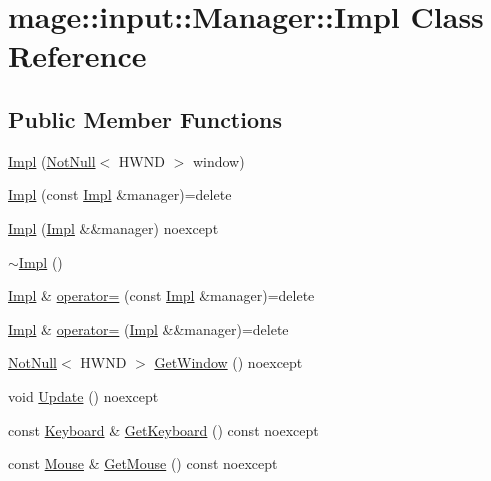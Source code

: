 \hypertarget{classmage_1_1input_1_1_manager_1_1_impl}{}\section{mage\+:\+:input\+:\+:Manager\+:\+:Impl Class Reference}
\label{classmage_1_1input_1_1_manager_1_1_impl}
\subsection*{Public Member Functions}
\begin{DoxyCompactItemize}
\item 
\mbox{\hyperlink{classmage_1_1input_1_1_manager_1_1_impl_ac0bc834732b5870792d1b6557e9bbaf7}{Impl}} (\mbox{\hyperlink{namespacemage_a8769f9d670d6b585ea306cb1062af94b}{Not\+Null}}$<$ H\+W\+ND $>$ window)
\item 
\mbox{\hyperlink{classmage_1_1input_1_1_manager_1_1_impl_a9c1f7ee1af99eb2811820d622850dc06}{Impl}} (const \mbox{\hyperlink{classmage_1_1input_1_1_manager_1_1_impl}{Impl}} \&manager)=delete
\item 
\mbox{\hyperlink{classmage_1_1input_1_1_manager_1_1_impl_a15372813362704488fc264aa5d784b0e}{Impl}} (\mbox{\hyperlink{classmage_1_1input_1_1_manager_1_1_impl}{Impl}} \&\&manager) noexcept
\item 
\mbox{\hyperlink{classmage_1_1input_1_1_manager_1_1_impl_ac8699aba365e2b08ea6564f8b63b6ae0}{$\sim$\+Impl}} ()
\item 
\mbox{\hyperlink{classmage_1_1input_1_1_manager_1_1_impl}{Impl}} \& \mbox{\hyperlink{classmage_1_1input_1_1_manager_1_1_impl_a1b60284e1656b2a864bb29580c7a0107}{operator=}} (const \mbox{\hyperlink{classmage_1_1input_1_1_manager_1_1_impl}{Impl}} \&manager)=delete
\item 
\mbox{\hyperlink{classmage_1_1input_1_1_manager_1_1_impl}{Impl}} \& \mbox{\hyperlink{classmage_1_1input_1_1_manager_1_1_impl_a0dcf4b3269e6cd96b9c5864663c86322}{operator=}} (\mbox{\hyperlink{classmage_1_1input_1_1_manager_1_1_impl}{Impl}} \&\&manager)=delete
\item 
\mbox{\hyperlink{namespacemage_a8769f9d670d6b585ea306cb1062af94b}{Not\+Null}}$<$ H\+W\+ND $>$ \mbox{\hyperlink{classmage_1_1input_1_1_manager_1_1_impl_a79b6d5d2d8290f3b3a40a7ee522de2bf}{Get\+Window}} () noexcept
\item 
void \mbox{\hyperlink{classmage_1_1input_1_1_manager_1_1_impl_ac9e9b6d976dfdb2379664cf362c68600}{Update}} () noexcept
\item 
const \mbox{\hyperlink{classmage_1_1input_1_1_keyboard}{Keyboard}} \& \mbox{\hyperlink{classmage_1_1input_1_1_manager_1_1_impl_a7b43fbe5a7fd8697fea0e3c6b7d76186}{Get\+Keyboard}} () const noexcept
\item 
const \mbox{\hyperlink{classmage_1_1input_1_1_mouse}{Mouse}} \& \mbox{\hyperlink{classmage_1_1input_1_1_manager_1_1_impl_a0ed01275d65a2fe3998c95fef0e12a8b}{Get\+Mouse}} () const noexcept
\end{DoxyCompactItemize}
